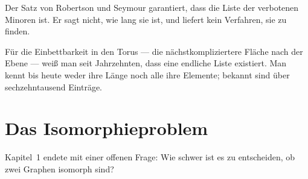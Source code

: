 \begin{warnung}
Der Satz von Robertson und Seymour garantiert, dass die Liste der verbotenen Minoren  ist. Er sagt nicht, wie lang sie ist, und liefert kein Verfahren, sie zu finden.

Für die Einbettbarkeit in den Torus --- die nächstkompliziertere Fläche nach der Ebene --- weiß man seit Jahrzehnten, dass eine endliche Liste existiert. Man kennt bis heute weder ihre Länge noch alle ihre Elemente; bekannt sind über sechzehntausend Einträge.

\begin{center}
\begin{minipage}{0.88\textwidth}
\end{minipage}
\end{center}
\end{warnung}

\section{Das Isomorphieproblem}

Kapitel~1 endete mit einer offenen Frage: Wie schwer ist es zu entscheiden, ob zwei Graphen isomorph sind?

